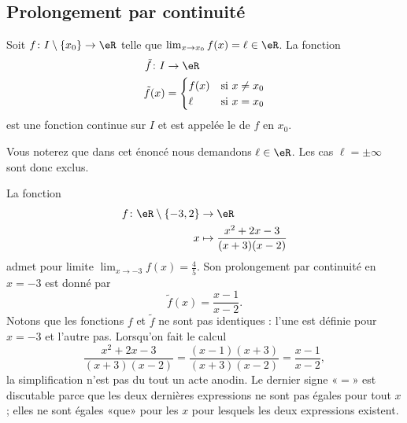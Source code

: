 \subsection{Prolongement par continuité}

\begin{propositionDef}
    Soit \( f\colon I\setminus\{ x_0 \}\to \eR\) telle que \( \lim_{x\to x_{0}} f(x)=\ell\in \eR\). La fonction
    \begin{equation}
        \begin{aligned}
            \tilde f\colon I&\to \eR \\
            \tilde f(x)&=\begin{cases}
                f(x)    &   \text{si } x\neq x_0\\
                \ell    &    \text{si } x=x_0
            \end{cases}
        \end{aligned}
    \end{equation}
    est une fonction continue sur \( I\) et est appelée le  de \( f\) en \( x_0\).
\end{propositionDef}
Vous noterez que dans cet énoncé nous demandons \( \ell\in \eR\). Les cas \( \ell=\pm\infty\) sont donc exclus.

\begin{example}
    La fonction
    \begin{equation}
        \begin{aligned}
            f\colon \eR\setminus\{ -3,2 \}&\to \eR \\
            x&\mapsto  \frac{ x^2+2x-3 }{ (x+3)(x-2) }
        \end{aligned}
    \end{equation}
    admet pour limite \( \lim_{x\to -3} f(x)=\frac{ 4 }{ 5 }\). Son prolongement par continuité en \( x=-3\) est donné par
    \begin{equation}
        \tilde f(x)=\frac{ x-1 }{ x-2 }.
    \end{equation}
    Notons que les fonctions \( f\) et \( \tilde f\) ne sont pas identiques : l'une est définie pour \( x=-3\) et l'autre pas. Lorsqu'on fait le calcul
    \begin{equation}
        \frac{ x^2+2x-3 }{ (x+3)(x-2) }=\frac{ (x-1)(x+3) }{ (x+3)(x-2) }=\frac{ x-1 }{ x-2 },
    \end{equation}
    la simplification n'est pas du tout un acte anodin. Le dernier signe «\( =\)» est discutable parce que les deux dernières expressions ne sont pas égales pour tout \( x\); elles ne sont égales «que» pour les \( x\) pour lesquels les deux expressions existent.
\end{example}

